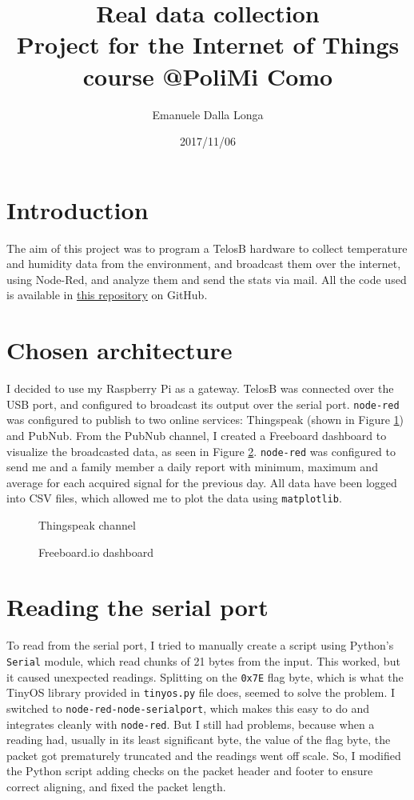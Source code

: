 \documentclass[11pt]{article}
\title{\textbf{Real data collection}\\
				\large Project for the Internet of Things course @PoliMi Como}
\author{Emanuele Dalla Longa}
\date{2017/11/06}
\begin{document}
\maketitle

\section{Introduction}
The aim of this project was to program a TelosB hardware to collect temperature and humidity data from the environment, and broadcast them over the internet, using Node-Red, and analyze them and send the stats via mail. All the code used is available in \href{https://github.com/infinitesnow/IOT2016}{this repository} on GitHub.

\section{Chosen architecture}
I decided to use my Raspberry Pi as a gateway. TelosB was connected over the USB port, and configured to broadcast its output over the serial port. \texttt{node-red} was configured to publish to two online services: Thingspeak (shown in Figure \ref{fig:thingspeak}) and PubNub. From the PubNub channel, I created a Freeboard dashboard to visualize the broadcasted data, as seen in Figure \ref{fig:freeboard}. \texttt{node-red} was configured to send me and a family member a daily report with minimum, maximum and average for each acquired signal for the previous day. All data have been logged into CSV files, which allowed me to plot the data using \texttt{matplotlib}.

\begin{figure}
\caption{Thingspeak channel}
\label{fig:thingspeak}
\end{figure}

\begin{figure}
\caption{Freeboard.io dashboard}
\label{fig:freeboard}
\end{figure}

\section{Reading the serial port}
To read from the serial port, I tried to manually create a script using Python's \texttt{Serial} module, which read chunks of 21 bytes from the input. This worked, but it caused unexpected readings. Splitting on the \texttt{0x7E} flag byte, which is what the TinyOS library provided in \texttt{tinyos.py} file does, seemed to solve the problem. I switched to \texttt{node-red-node-serialport}, which makes this easy to do and integrates cleanly with \texttt{node-red}. But I still had problems, because when a reading had, usually in its least significant byte, the value of the flag byte, the packet got prematurely truncated and the readings went off scale. So, I modified the Python script adding checks on the packet header and footer to ensure correct aligning, and fixed the packet length.  
 
\end{document}
